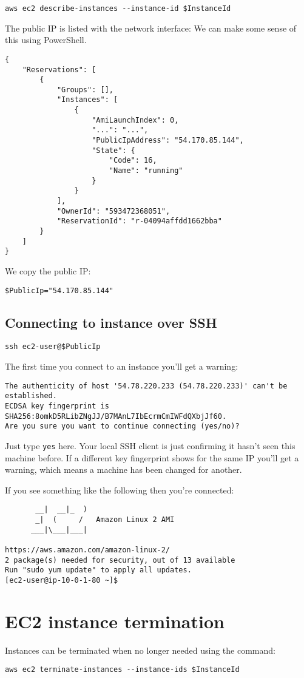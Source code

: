 \documentclass{pgnotes}
\begin{document}
\begin{verbatim}
aws ec2 describe-instances --instance-id $InstanceId
\end{verbatim}

The public IP is listed with the network interface:
We can make some sense of this using PowerShell.

\begin{verbatim}
{
    "Reservations": [
        {
            "Groups": [],
            "Instances": [
                {
                    "AmiLaunchIndex": 0,
                    "...": "...",
                    "PublicIpAddress": "54.170.85.144",
                    "State": {
                        "Code": 16,
                        "Name": "running"
                    }
                }
            ],
            "OwnerId": "593472368051",
            "ReservationId": "r-04094affdd1662bba"
        }
    ]
}
\end{verbatim}

We copy the public IP:
\begin{verbatim}
$PublicIp="54.170.85.144"
\end{verbatim}

\subsection{Connecting to instance over
SSH}\label{sec:connecting-to-instance-over-ssh}

\begin{verbatim}
ssh ec2-user@$PublicIp 
\end{verbatim}

The first time you connect to an instance you'll get a warning:

\begin{verbatim}
The authenticity of host '54.78.220.233 (54.78.220.233)' can't be established.
ECDSA key fingerprint is SHA256:8omkD5RLibZNgJJ/B7MAnL7IbEcrmCmIWFdQXbjJf60.
Are you sure you want to continue connecting (yes/no)?
\end{verbatim}

Just type \texttt{yes} here. Your local SSH client is just confirming it
hasn't seen this machine before. If a different key fingerprint shows
for the same IP you'll get a warning, which means a machine has been
changed for another.

If you see something like the following then you're connected:

\begin{verbatim}
       __|  __|_  )
       _|  (     /   Amazon Linux 2 AMI
      ___|\___|___|

https://aws.amazon.com/amazon-linux-2/
2 package(s) needed for security, out of 13 available
Run "sudo yum update" to apply all updates.
[ec2-user@ip-10-0-1-80 ~]$ 
\end{verbatim}

\section{EC2 instance termination}\label{ec2-instance-termination}

Instances can be terminated when no longer needed using the command:

\begin{verbatim}
aws ec2 terminate-instances --instance-ids $InstanceId
\end{verbatim}
\end{document}
